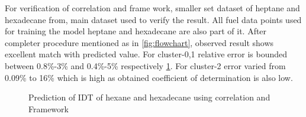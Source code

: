 \documentclass[preprint,12pt]{elsarticle}
\begin{document}
				  		  For verification of correlation and frame work, smaller set dataset of heptane and hexadecane from, main dataset used to verify the result. All fuel data points used for training the model heptane and hexadecane are also part of it. After completer procedure mentioned as in \ref{fig:flowchart}, observed result shows excellent match with predicted value. For cluster-0,1 relative error is bounded between 0.8\%-3\% and 0.4\%-5\% respectively \ref{fig:all_fuel}. For cluster-2  error varied from 0.09\% to 16\% which is high as obtained coefficient of determination is also low.				  		  
				  		  
			  		    \begin{figure}[H]
			  		    	\centering
			  		    	\hspace{0.5cm}
			  		    	\caption{Prediction of IDT of hexane and hexadecane using correlation and Framework}
			  		    	\label{fig:all_fuel}
			  		    \end{figure}
			  		    
\end{document}
